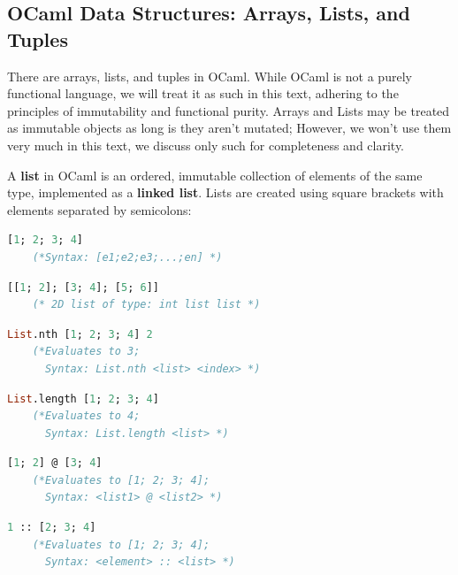 \newpage

\subsection{OCaml Data Structures: Arrays, Lists, and Tuples}

There are arrays, lists, and tuples in OCaml. While OCaml is not a purely functional language, we will treat it as such in this text, adhering to the principles of immutability and functional purity.
Arrays and Lists may be treated as immutable objects as long is they aren't mutated; However, we won't use them very much in this text, we discuss only such for completeness and clarity.

\begin{Def}

    A \textbf{list} in OCaml is an ordered, immutable collection of elements of the same type, 
    implemented as a \textbf{linked list}. Lists are created using square brackets \snippet{[ ]} 
    with elements separated by semicolons:
    \begin{lstlisting}[language=OCaml, caption={Defining a List}, numbers=none]
    [1; 2; 3; 4]
    (*Syntax: [e1;e2;e3;...;en] *)
    \end{lstlisting}

    \begin{lstlisting}[language=OCaml, caption={List of Lists}, numbers=none]
    [[1; 2]; [3; 4]; [5; 6]]
    (* 2D list of type: int list list *)   
    \end{lstlisting}

    \begin{lstlisting}[language=OCaml, caption={Indexing a List}, numbers=none]
    List.nth [1; 2; 3; 4] 2
    (*Evaluates to 3; 
      Syntax: List.nth <list> <index> *)
    \end{lstlisting}

    \begin{lstlisting}[language=OCaml, caption={Finding Length}, numbers=none]
    List.length [1; 2; 3; 4]
    (*Evaluates to 4; 
      Syntax: List.length <list> *)
    \end{lstlisting}

    \begin{lstlisting}[language=OCaml, caption={Joining Lists}, numbers=none]
    [1; 2] @ [3; 4]
    (*Evaluates to [1; 2; 3; 4]; 
      Syntax: <list1> @ <list2> *)
    \end{lstlisting}

    \begin{lstlisting}[language=OCaml, caption={Cons Operator (::) Appending One Head Element}, numbers=none]
    1 :: [2; 3; 4]
    (*Evaluates to [1; 2; 3; 4]; 
      Syntax: <element> :: <list> *)
    \end{lstlisting}
\end{Def}

